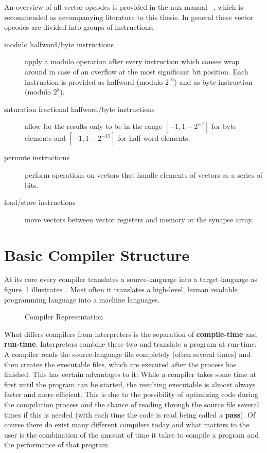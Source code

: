 {An overview of all vector opcodes is provided in the nux manual ~\cite[ch.~5]{nuxmanual}, which is recommended as accompanying literature to this thesis.
In general these vector opcodes are divided into groups of instructions:
\begin{description}
    \item[modulo halfword/byte instructions] apply a modulo operation after every instruction which causes wrap around in case of an overflow at the most significant bit position.
        Each instruction is provided as halfword (modulo $2^{16}$) and as byte instruction (modulo $2^{8}$).
    \item[saturation fractional halfword/byte instructions] allow for the results only to be in the range $[-1, 1-2^{-7}]$ for byte elements and $[-1, 1-2^{-15}]$ for half-word elements.
    \item[permute instructions] perform operations on vectors that handle elements of vectors as a series of bits.
    \item[load/store instructions] move vectors between vector registers and memory or the synapse array.
\end{description}


\section{Basic Compiler Structure}
\label{section:compiler}

At its core every compiler translates a source-language into a target-language as figure~\ref{fig:compiler} illustrates~\cite[p.~3]{UBHD-66483012}.
Most often it translates a high-level, human readable programming language into a machine languages.

\begin{figure}
    \captionsetup{format=plain, indention=.6cm, labelsep=newline,singlelinecheck=false}
    \centering
    \vspace*{-3em}
    
    \caption{\label{fig:compiler} Compiler Representation}
\end{figure}

What differs compilers from interpreters is the separation of \textbf{compile-time} and \textbf{run-time}.
Interpreters combine these two and translate a program at run-time.
A compiler reads the source-language file completely (often several times) and then creates the executable files, which are executed after the process has finished.
This has certain advantages to it:
While a compiler takes some time at first until the program can be started, the resulting executable is almost always faster and more efficient.
This is due to the possibility of optimizing code during the compilation process and the chance of reading through the source file several times if this is needed (with each time the code is read being called a \textbf{pass}).
Of course there do exist many different compilers today and what matters to the user is the combination of the amount of time it takes to compile a program and the performance of that program.

}
